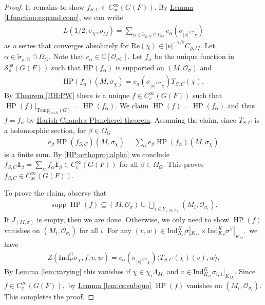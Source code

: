 \documentclass[10pt]{amsart}
\theoremstyle{definition}
\numberwithin{equation}{section}
\DeclareMathOperator{\supp}{\mathrm{supp}}
\numberwithin{equation}{subsection}
\newcommand{\Ind}{\mathrm{Ind}}
\newcommand{\CC}{\mathbb{C}}
\newcommand{\Temp}{\mathrm{Temp}}
\newcommand{\HP}{\mathop{\mathrm{HP}}\nolimits}
\begin{document}
\begin{proof} It remains to show $f_{S,C}\in C^\infty_{\mathrm{ac}}(G(F)).$ By \hyperref[Lfunction:expand:cone]{Lemma \ref{Lfunction:expand:cone}},  we can write 
\begin{align*}
       L(1/2,\sigma_\chi,\rho_M) = \sum_{\alpha\in\widetilde{\sigma}_{\rho,G}\cap \Omega_G} c_\alpha(\sigma_{|\nu|^{1/2}\chi})
\end{align*}
as a series that converges absolutely for $\mathrm{Re}(\chi)\in |\nu|^{-1/2}C_{\rho,M}.$ Let $\alpha\in \widetilde{\sigma}_{\rho,G}\cap \Omega_G.$ Note that $c_\alpha\in \CC[\mathcal{O}_{\sigma\CC}].$ Let $f_\alpha$ be the unique function in $\mathcal{S}^{\mathrm{as}}_\rho(G(F))$ such that $\mathrm{HP}(f_\alpha)$ is supported on $(M,\mathcal{O}_\sigma)$ and
\begin{align*}
    \mathrm{HP}(f_\alpha)(M,\sigma_\chi)=c_\alpha(\sigma_{|\nu|^{1/2}\chi})T_{S,C}(\chi).
\end{align*}
By \hyperref[BH:PW]{Theorem \ref{BH:PW}} there is a unique $f\in C^\infty_c(G(F))$ such that $\HP(f)|_{\Temp_{\Ind,0}(G)}=\HP(f_{\alpha}).$ We claim $\HP(f)=\HP(f_\alpha)$ and thus $f=f_\alpha$ by \hyperref[HCPlan]{Harish-Chandra Plancherel theorem}. Assuming the claim, since $T_{S,C}$ is a holomorphic section, for $\beta\in \Omega_G$
\begin{align*}
    e_\beta\HP(f_{S,C})(M,\sigma_\chi) = \sum_\alpha e_\beta \HP(f_\alpha)(M,\sigma_\chi)
\end{align*}
is a finite sum. By \eqref{HP:orthoproj:alpha} we conclude $f_{S,C}\mathbf{1}_\beta = \sum_\alpha f_\alpha\mathbf{1}_\beta\in C_c^\infty(G(F))$ for all $\beta\in \Omega_G$. This proves $f_{S,C}\in C^\infty_{\mathrm{ac}}(G(F))$.

    To prove the claim, observe that 
    \begin{align*}
        \supp \HP(f)\subseteq (M,\mathcal{O}_\sigma)\cup \bigcup_{i\in Y_{(M,\sigma)}}  (M_i,\mathcal{O}_{\sigma_i}).
    \end{align*}
    If $J_{(M,\sigma)}$ is empty, then we are done. Otherwise, we only need to show $\HP(f)$ vanishes on $(M_i,\mathcal{O}_{\sigma_i})$ for all $i$. For any $(v,w)\in \Ind_{K_{P}}^K \sigma|_{K_M}\times \Ind_{K_{P}}^K \sigma^\lor|_{K_M},$ we have
    \begin{align*}
        Z(\mathrm{\Ind}_{P}^G \sigma_\chi,f,v,w)=c_{\alpha}(\sigma_{|\nu|^{1/2}\chi})\langle T_{S,C}(\chi)(v),w\rangle.
    \end{align*}
    By \hyperref[lem:varying]{Lemma \ref{lem:varying}} this vanishes if $\chi\in \chi_i\Lambda_{M_i}$ and $v\in \mathrm{Ind}_{K_{P_i}}^K \sigma_{i,1}|_{K_{M_i}}.$ Since $f\in C^\infty_c(G(F)),$  by  \hyperref[lem:cs:subquo]{Lemma \ref{lem:cs:subquo}} $\HP(f)$ vanishes on $(M_i,\mathcal{O}_{\sigma_i})$. This completes the proof.
\end{proof}
\end{document}
